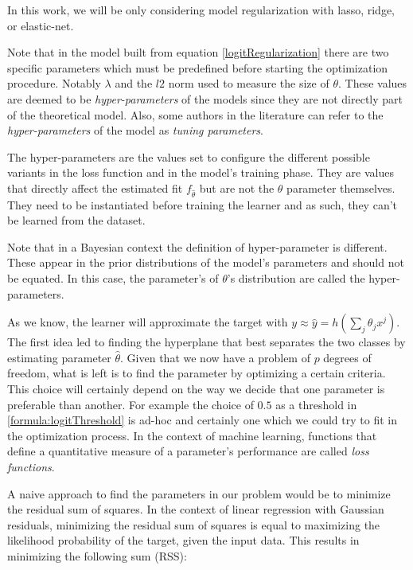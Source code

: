 In this work, we will be only considering model regularization with lasso, ridge, or elastic-net.

Note that in the model built from equation \ref{logitRegularization} there are two specific parameters which must be predefined before starting the optimization procedure. Notably  $\lambda$ and the $l2$ norm used to measure the size of $\theta$. These values are deemed to be \textit{hyper-parameters} of the models since they are not directly part of the theoretical model. Also, some authors in the literature can refer to the \textit{hyper-parameters} of the model as \textit{tuning parameters}.

The hyper-parameters are the values set to configure the different possible variants in the loss function and in the model's training phase.  They are values that directly affect the estimated fit $f_{\hat{\theta}}$ but are not the $\theta$ parameter themselves.  They need to be instantiated before training the learner and as such, they can't be learned from the dataset.

Note that in a Bayesian context the definition of hyper-parameter is different. These appear in the  prior distributions of the model's parameters and should not be equated. In this case, the parameter's of $\theta$'s distribution are called the hyper-parameters.


\textit{}


As we know, the learner will approximate the target with $y \approx \hat{y} = h\left(\sum_{j}\theta_j x^j\right)$. The first idea led to finding the hyperplane that best separates the two classes by estimating parameter $\hat{\theta}$. Given that we now have a problem of $p$ degrees of freedom, what is left is to find the parameter by optimizing a certain criteria. This choice will certainly depend on the way we decide that one parameter is preferable than another. For example the choice of $0.5$ as a threshold in \ref{formula:logitThreshold} is ad-hoc and certainly one which we could try to fit in the optimization process. In the context of machine learning, functions that define a quantitative measure of a parameter's performance  are called \textit{loss functions}.

A naive approach to find the parameters in our problem would be to minimize the residual sum of squares. In the context of linear regression with Gaussian residuals, minimizing the residual sum of squares is equal to maximizing the likelihood probability of the target, given the input data. This results in minimizing the following sum (RSS):

